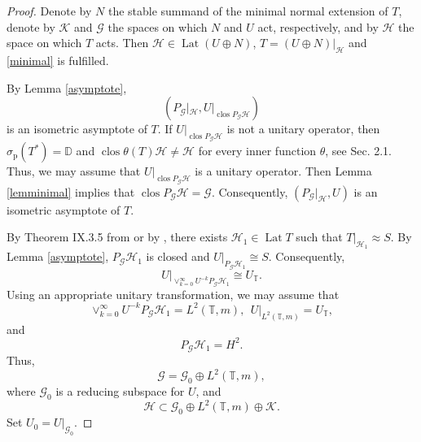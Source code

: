 \documentclass[a4paper,oneside,11pt]{amsart}
\numberwithin{equation}{section}
\theoremstyle{plain}
\theoremstyle{definition}
\begin{document}
\begin{proof} Denote by $N$ the stable summand of the minimal normal extension of $T$, denote by $\mathcal K$
 and $\mathcal G$ the spaces on which $N$ and $U$ act, respectively,
and by $\mathcal H$ the space on which $T$ acts. Then  $\mathcal H\in\operatorname{Lat}(U\oplus N)$, 
$T=(U\oplus N)|_{\mathcal H}$ and \eqref{minimal} is fulfilled. 
 
By Lemma \ref{asymptote}, 
\begin{equation*} (P_{\mathcal G}|_{\mathcal H}, U|_{\operatorname{clos}P_{\mathcal G}\mathcal H})
 \end{equation*}
is an isometric asymptote of $T$.
If $U|_{\operatorname{clos}P_{\mathcal G}\mathcal H}$ is not a unitary operator, 
then  $\sigma_{\mathrm{p}}(T^*)=\mathbb D$ and 
$\operatorname{clos}\theta(T)\mathcal H\neq\mathcal H$ for every inner function $\theta$, see Sec. 2.1.
Thus, we may assume that $U|_{\operatorname{clos}P_{\mathcal G}\mathcal H}$ is a unitary operator.  
Then  Lemma \ref{lemminimal} implies that  $\operatorname{clos}P_{\mathcal G}\mathcal H=\mathcal G$. Consequently, 
$(P_{\mathcal G}|_{\mathcal H}, U)$ is an isometric asymptote of $T$.


By Theorem IX.3.5 from \cite{sznfbk} or by \cite{k07}, there exists  $\mathcal H_1\in\operatorname{Lat}T$  
such that $T|_{\mathcal H_1}\approx S$.  By Lemma \ref{asymptote}, $P_{\mathcal G}{\mathcal H_1}$ is closed 
and $U|_{P_{\mathcal G}{\mathcal H_1}}\cong S$. Consequently,
\begin{equation*} U|_{\vee_{k=0}^\infty U^{-k}P_{\mathcal G}{\mathcal H_1}}\cong U_{\mathbb T}.
\end{equation*}
Using an appropriate unitary transformation, we may assume that 
\begin{equation*}
\vee_{k=0}^\infty U^{-k}P_{\mathcal G}{\mathcal H_1}=L^2(\mathbb T,m),\ \  U|_{L^2(\mathbb T,m)}=U_{\mathbb T},
\end{equation*}
 and
\begin{equation}\label{ppgghh1} P_{\mathcal G}{\mathcal H_1}=H^2. \end{equation}
Thus, \begin{equation}\label{gg}\mathcal G=\mathcal G_0\oplus L^2(\mathbb T,m),
\end{equation}
 where $\mathcal G_0$ is a reducing subspace for $U$, and 
\begin{equation*}\mathcal H\subset\mathcal G_0\oplus L^2(\mathbb T,m)\oplus\mathcal K.
\end{equation*}
Set $U_0=U|_{\mathcal G_0}$.


\end{proof}
\end{document}
